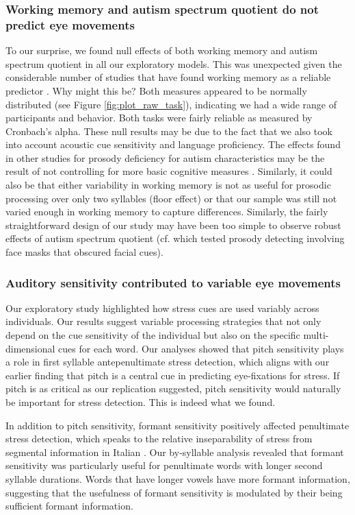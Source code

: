 \subsubsection{Working memory and autism spectrum quotient do not predict eye movements}
To our surprise, we found null effects of both working memory and autism spectrum quotient in all our exploratory models. This was unexpected given the considerable number of studies that have found working memory as a reliable predictor \citep{Traxler2009, Huettig2016}. Why might this be? Both measures appeared to be normally distributed (see Figure \ref{fig:plot_raw_task}), indicating we had a wide range of participants and behavior. Both tasks were fairly reliable as measured by Cronbach's alpha. These null results may be due to the fact that we also took into account acoustic cue sensitivity and language proficiency. The effects found in other studies for prosody deficiency for autism characteristics may be the result of not controlling for more basic cognitive measures \cite{grossman2023relationship, Liu2018}. Similarly, it could also be that either variability in working memory is not as useful for prosodic processing over only two syllables (floor effect) or that our sample was still not varied enough in working memory to capture differences. Similarly, the fairly straightforward design of our study may have been too simple to observe robust effects of autism spectrum quotient (cf. \cite{Sinagra2022} which tested prosody detecting involving face masks that obscured facial cues).

\subsubsection{Auditory sensitivity contributed to variable eye movements}
 Our exploratory study highlighted how stress cues are used variably across individuals. Our results suggest variable processing strategies that not only depend on the cue sensitivity of the individual but also on the specific multi-dimensional cues for each word. Our analyses showed that pitch sensitivity plays a role in first syllable antepenultimate stress detection, which aligns with our earlier finding that pitch is a central cue in predicting eye-fixations for stress. If pitch is as critical as our replication suggested, pitch sensitivity would naturally be important for stress detection. This is indeed what we found.

In addition to pitch sensitivity, formant sensitivity positively affected penultimate stress detection, which speaks to the relative inseparability of stress from segmental information in Italian \citep{CutlerNorris1988, Tagliapietra2005}. Our by-syllable analysis revealed that formant sensitivity was particularly useful for penultimate words with longer second syllable durations. Words that have longer vowels have more formant information, suggesting that the usefulness of formant sensitivity is modulated by their being sufficient formant information.

